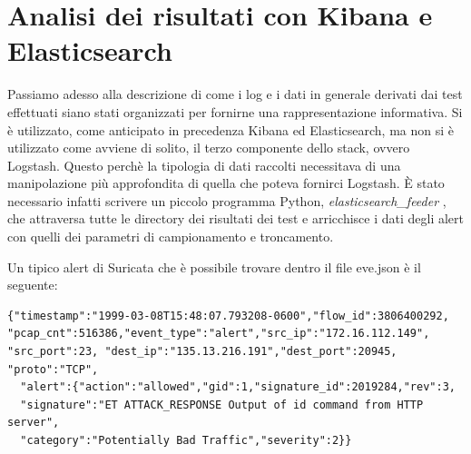 \documentclass[12pt,a4paper,openright,twoside]{report}
\begin{document}
\section{Analisi dei risultati con Kibana e Elasticsearch}

Passiamo adesso alla descrizione di come i log e i dati in generale derivati dai
test effettuati siano stati organizzati per fornirne una rappresentazione informativa.
Si \`e utilizzato, come anticipato in precedenza Kibana ed Elasticsearch, ma non si
\`e utilizzato come avviene di solito, il terzo componente dello stack, ovvero Logstash.
Questo perch\`e la tipologia di dati raccolti necessitava di una manipolazione pi\`u approfondita di
quella che poteva fornirci Logstash. \`E stato necessario infatti scrivere un piccolo programma
Python, {\it elasticsearch\_feeder }, che attraversa tutte le directory dei risultati dei test e arricchisce i dati degli
alert con quelli dei parametri di campionamento e troncamento.

Un tipico alert di Suricata che \`e possibile trovare dentro il file eve.json \`e il
seguente:
\begin{verbatim}
{"timestamp":"1999-03-08T15:48:07.793208-0600","flow_id":3806400292,
"pcap_cnt":516386,"event_type":"alert","src_ip":"172.16.112.149",
"src_port":23, "dest_ip":"135.13.216.191","dest_port":20945,
"proto":"TCP",
  "alert":{"action":"allowed","gid":1,"signature_id":2019284,"rev":3,
  "signature":"ET ATTACK_RESPONSE Output of id command from HTTP server",
  "category":"Potentially Bad Traffic","severity":2}}
\end{verbatim}
\end{document}
